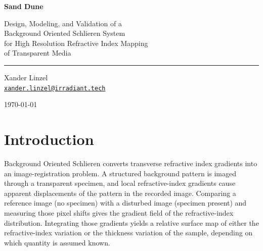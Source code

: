 \documentclass[11pt]{article}
\begin{document}
\begin{titlepage}
  \centering
  \vspace*{4cm}
  {\Huge\bfseries Sand Dune\par}
  \vspace{0.5em}
  {\large Design, Modeling, and Validation of a\\
   Background Oriented Schlieren System \\
   for High Resolution Refractive Index Mapping \\
   of Transparent Media\par}
  \vspace{2em}
  \hrule
  \vspace{1.5em}
  {\large Xander Linzel\\
   \href{mailto:xander.linzel@irradiant.tech}{\texttt{xander.linzel@irradiant.tech}}\par}
  \vspace{1em}
  {\normalsize \today\par}
  \vfill
  \begin{abstract}
    \setlength{\parindent}{0pt}
    Sand Dune is a custom Background Oriented Schlieren (BOS) system for
    quantitative measurement of weak refractive disturbances in transparent
    media. The project combines a dedicated optical rig with a desktop
    application that handles image loading, windowed cross-correlation,
    vector validation, surface reconstruction, visualization, and export.
    This document describes the optical geometry and physical model, the
    numerical processing pipeline in detail, how to use the application,
    and the testing strategy used to validate the software during development.
  \end{abstract}
\end{titlepage}

\tableofcontents
\clearpage

\section{Introduction}
\label{sec:intro}

Background Oriented Schlieren converts transverse refractive index gradients into an
image-registration problem. A structured background pattern is imaged through
a transparent specimen, and local refractive-index gradients cause apparent
displacements of the pattern in the recorded image. Comparing a reference
image (no specimen) with a disturbed image (specimen present) and measuring
those pixel shifts gives the gradient field of the refractive-index distribution.
Integrating those gradients yields a relative surface map of either the
refractive-index variation or the thickness variation of the sample,
depending on which quantity is assumed known.
\end{document}
